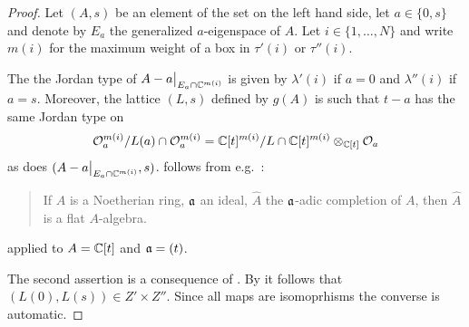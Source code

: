 \documentclass[draft]{article}
\begin{document}
\begin{proof}
    Let $(A,s)$ be an element of the set on the left hand side, let $a\in\{0,s\}$ and denote by $E_a$ the generalized $a$-eigenspace of $A$. 
    Let $i\in \{1,\dots,N\}$ and write $m(i)$ for the maximum weight of a box in $\tau'(i)$ or $\tau''(i)$. 
    
    The the Jordan type of $A-a\big|_{E_a\cap\mathbb C^{m(i)}}$ is given by $\lambda'(i)$ if $a = 0$ and $\lambda''(i)$ if $a = s$. 
    Moreover, the lattice $(L,s)$ defined by $g(A)$ is such that $t-a$ has the same Jordan type on 
    \begin{equation}
        \label{eq:bcflat}
        \mathcal O_a^{m(i)} / L(a)\cap\mathcal O_a^{m(i)} = \mathbb C[t]^{m(i)}/L\cap\mathbb C[t]^{m(i)}\otimes_{\mathbb C[t]}\mathcal O_a 
    \end{equation}
    as does $(A-a\big|_{E_a\cap\mathbb C^{m(i)}},s)$. 
     follows from e.g.\ \cite[Proposition~10.14]{atiyah2018introduction}:
    \begin{quotation}
        If $A$ is a Noetherian ring, $\mathfrak a$ an ideal, $\hat A$ the $\mathfrak a$-adic completion of $A$, then $\hat A$ is a flat $A$-algebra.
    \end{quotation}
    applied to $A = \mathbb C[t]$ and $\mathfrak a = (t)$. 
    
    
    The second assertion is a consequence of  . 
    By   it follows that $(L(0),L(s)) \in Z'\times Z''$. 
    Since all maps are isomoprhisms the converse is automatic. 
\end{proof}
\end{document}
